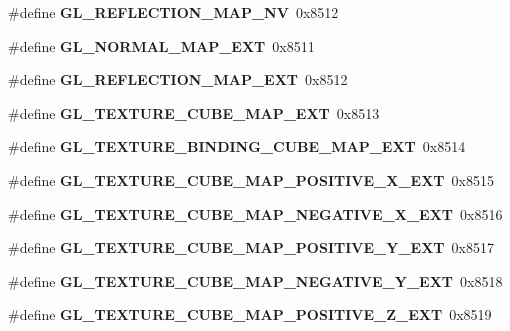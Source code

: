 \begin{DoxyCompactItemize}
\item 
\#define {\bfseries G\+L\+\_\+\+R\+E\+F\+L\+E\+C\+T\+I\+O\+N\+\_\+\+M\+A\+P\+\_\+\+N\+V}~0x8512\label{_s_d_l__opengl_8h_ad38be0d100e800582db0192dd5cceade}

\item 
\#define {\bfseries G\+L\+\_\+\+N\+O\+R\+M\+A\+L\+\_\+\+M\+A\+P\+\_\+\+E\+X\+T}~0x8511\label{_s_d_l__opengl_8h_af332e7a4d63af4227521f8cc86bcf9df}

\item 
\#define {\bfseries G\+L\+\_\+\+R\+E\+F\+L\+E\+C\+T\+I\+O\+N\+\_\+\+M\+A\+P\+\_\+\+E\+X\+T}~0x8512\label{_s_d_l__opengl_8h_a11eb51c5c9b84bd0ee1942124b5322c8}

\item 
\#define {\bfseries G\+L\+\_\+\+T\+E\+X\+T\+U\+R\+E\+\_\+\+C\+U\+B\+E\+\_\+\+M\+A\+P\+\_\+\+E\+X\+T}~0x8513\label{_s_d_l__opengl_8h_a68d6f70fd3d5ff2aa08be209eabc5cd8}

\item 
\#define {\bfseries G\+L\+\_\+\+T\+E\+X\+T\+U\+R\+E\+\_\+\+B\+I\+N\+D\+I\+N\+G\+\_\+\+C\+U\+B\+E\+\_\+\+M\+A\+P\+\_\+\+E\+X\+T}~0x8514\label{_s_d_l__opengl_8h_a261b1cbc01a8cfb6392899d4102a9285}

\item 
\#define {\bfseries G\+L\+\_\+\+T\+E\+X\+T\+U\+R\+E\+\_\+\+C\+U\+B\+E\+\_\+\+M\+A\+P\+\_\+\+P\+O\+S\+I\+T\+I\+V\+E\+\_\+\+X\+\_\+\+E\+X\+T}~0x8515\label{_s_d_l__opengl_8h_a91b80e0a1b17c7c43a0b600a18453590}

\item 
\#define {\bfseries G\+L\+\_\+\+T\+E\+X\+T\+U\+R\+E\+\_\+\+C\+U\+B\+E\+\_\+\+M\+A\+P\+\_\+\+N\+E\+G\+A\+T\+I\+V\+E\+\_\+\+X\+\_\+\+E\+X\+T}~0x8516\label{_s_d_l__opengl_8h_a3d5db18efe926c7794bc80c90db463d8}

\item 
\#define {\bfseries G\+L\+\_\+\+T\+E\+X\+T\+U\+R\+E\+\_\+\+C\+U\+B\+E\+\_\+\+M\+A\+P\+\_\+\+P\+O\+S\+I\+T\+I\+V\+E\+\_\+\+Y\+\_\+\+E\+X\+T}~0x8517\label{_s_d_l__opengl_8h_a4c9debc2e4ed71ca6bef0ddecf1c9713}

\item 
\#define {\bfseries G\+L\+\_\+\+T\+E\+X\+T\+U\+R\+E\+\_\+\+C\+U\+B\+E\+\_\+\+M\+A\+P\+\_\+\+N\+E\+G\+A\+T\+I\+V\+E\+\_\+\+Y\+\_\+\+E\+X\+T}~0x8518\label{_s_d_l__opengl_8h_abd836ef8c6c0c15f2c0ba79c0c1c5d22}

\item 
\#define {\bfseries G\+L\+\_\+\+T\+E\+X\+T\+U\+R\+E\+\_\+\+C\+U\+B\+E\+\_\+\+M\+A\+P\+\_\+\+P\+O\+S\+I\+T\+I\+V\+E\+\_\+\+Z\+\_\+\+E\+X\+T}~0x8519\label{_s_d_l__opengl_8h_a32f85ceff1789ae7a3b4831f38a25bf4}


\end{DoxyCompactItemize}
